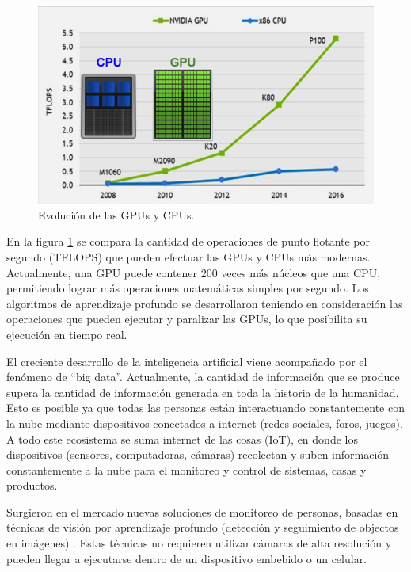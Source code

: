 \begin{figure}[ht]
	\centering
	\includegraphics[scale=.8]{./Figures/cpuGPU.jpg}
	\caption{Evolución de las GPUs y CPUs\protect\footnotemark.}
	\label{fig:cpuGPU}
\end{figure}


En la figura \ref{fig:cpuGPU} se compara la cantidad de operaciones de punto flotante por segundo (TFLOPS) \citep{TFLOPS} que pueden efectuar las GPUs y CPUs más modernas. Actualmente, una GPU puede contener 200 veces más núcleos que una CPU, permitiendo lograr más operaciones matemáticas simples por segundo. Los algoritmos de aprendizaje profundo se desarrollaron teniendo en consideración las operaciones que pueden ejecutar y paralizar las GPUs, lo que posibilita su ejecución en tiempo real.

El creciente desarrollo de la inteligencia artificial viene acompañado por el fenómeno de ``big data''. Actualmente, la cantidad de información que se produce supera la cantidad de información generada en toda la historia de la humanidad. Esto es posible ya que todas las personas están interactuando constantemente con la nube mediante dispositivos conectados a internet (redes sociales, foros, juegos). A todo este ecosistema se suma internet de las cosas (IoT), en donde los dispositivos (sensores, computadoras, cámaras) recolectan y suben información constantemente a la nube para el monitoreo y control de sistemas, casas y productos.

\newpage

Surgieron en el mercado nuevas soluciones de monitoreo de personas, basadas en técnicas de visión por aprendizaje profundo (detección y seguimiento de objectos en imágenes) . Estas técnicas no requieren utilizar cámaras de alta resolución y pueden llegar a ejecutarse dentro de un dispositivo embebido o un celular.

